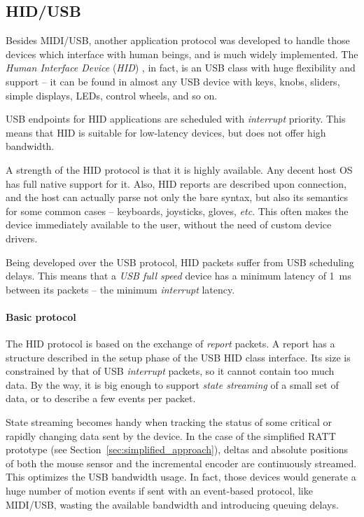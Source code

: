 \documentclass[a4paper,10pt]{article}
\begin{document}
\begin{multicols}{2}
\subsection{HID/USB}

Besides MIDI/USB, another application protocol was developed to handle those
devices which interface with human beings, and is much widely implemented.
The \emph{Human Interface Device} (\emph{HID}) \cite{hid_info}, in fact, is an
USB class with huge flexibility and support -- it can be found in almost any
USB device with keys, knobs, sliders, simple displays, LEDs, control wheels,
and so on.

USB endpoints for HID applications are scheduled with \emph{interrupt}
priority. This means that HID is suitable for low-latency devices, but does
not offer high bandwidth.

A strength of the HID protocol is that it is highly available. Any decent host
OS has full native support for it. Also, HID reports are described upon
connection, and the host can actually parse not only the bare syntax, but also
its semantics for some common cases -- keyboards, joysticks, gloves,
\emph{etc}. This often makes the device immediately available to the user,
without the need of custom device drivers.

Being developed over the USB protocol, HID packets suffer from USB scheduling
delays. This means that a \emph{USB full speed} device has a minimum latency
of 1~ms between its packets -- the minimum \emph{interrupt} latency.


\paragraph{Basic protocol}
The HID protocol is based on the exchange of \emph{report} packets. A report
has a structure described in the setup phase of the USB HID class interface.
Its size is constrained by that of USB \emph{interrupt} packets, so it cannot
contain too much data. By the way, it is big enough to support \emph{state
streaming} of a small set of data, or to describe a few events per packet.

State streaming becomes handy when tracking the status of some critical or
rapidly changing data sent by the device. In the case of the simplified RATT
prototype (see Section~\ref{sec:simplified_approach}), deltas and absolute
positions of both the mouse sensor and the incremental encoder are
continuously streamed. This optimizes the USB bandwidth usage. In fact, those
devices would generate a huge number of motion events if sent with an
event-based protocol, like MIDI/USB, wasting the available bandwidth and
introducing queuing delays.


\end{multicols}
\end{document}
